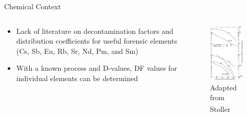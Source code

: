 \documentclass{beamer}
\newcommand{\tss}{\textsuperscript}
\begin{document}
\begin{frame}{Chemical Context}
  \begin{columns}
    \begin{column}{0.5\textwidth}
      \vspace{-10mm}
      \begin{itemize}
      \item{Lack of literature on decontamination factors and
        distribution coefficients for useful forensic elements (Cs, Sb,
        Eu, Rb, Sr, Nd, Pm, and Sm)}
      \item{With a known process and D-values, DF values for individual elements can
        be determined}
      \end{itemize}
    \end{column}
    \begin{column}{0.5\textwidth}
      \begin{figure}[H]
        \vspace*{-1cm}
        \begin{center}
          \includegraphics[scale = 0.55]{figures/Stoller2}
          \vspace{-0.5cm}
           \caption{\tiny{Adapted from Stoller\tss{\cite{stoller1961reactor}}}}
        \end{center}
      \end{figure}

\end{column}
\end{columns}
\end{frame}
\end{document}
